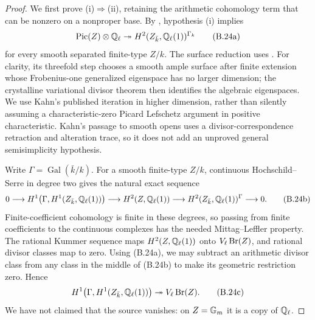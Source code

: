 \begin{proof}
We first prove (i)\(\Rightarrow\)(ii), retaining the arithmetic
cohomology term that can be nonzero on a nonproper base.
By \citet[Theorems~6 and~8, pp.~88--90]{BKahn2023Divisors},
hypothesis (i) implies
\[
 \operatorname{Pic}(Z)\otimes\mathbb Q_\ell
 \twoheadrightarrow H^2(Z_{\bar k},\mathbb Q_\ell(1))^{\Gamma_k}
 \tag{B.24a}
\]
for every smooth separated finite-type \(Z/k\).
The surface reduction uses
\citet[Proposition~4.1, Lemma~4.2 and Theorem~4.3,
author-version pp.~25--27]{BMorrow2019Variational}.
For clarity, its threefold step chooses a smooth ample surface
after finite extension whose Frobenius-one generalized eigenspace
has no larger dimension; the crystalline variational divisor
theorem then identifies the algebraic eigenspaces.  We use Kahn's
published iteration in higher dimension, rather than silently
assuming a characteristic-zero Picard Lefschetz argument in
positive characteristic.  Kahn's passage to smooth opens uses a
divisor-correspondence retraction and alteration trace, so it
does not add an unproved general semisimplicity hypothesis.

Write \(\Gamma=\operatorname{Gal}(\bar k/k)\).
For a smooth finite-type \(Z/k\), continuous Hochschild--Serre
in degree two gives the natural exact sequence
\[
 0\longrightarrow
 H^1\bigl(\Gamma,H^1(Z_{\bar k},\mathbb Q_\ell(1))\bigr)
 \longrightarrow H^2(Z,\mathbb Q_\ell(1))
 \longrightarrow H^2(Z_{\bar k},\mathbb Q_\ell(1))^\Gamma
 \longrightarrow0.
 \tag{B.24b}
\]
Finite-coefficient cohomology is finite in these degrees, so
passing from finite coefficients to the continuous complexes
has the needed Mittag--Leffler property.  The rational Kummer
sequence maps \(H^2(Z,\mathbb Q_\ell(1))\) onto
\(V_\ell\operatorname{Br}(Z)\), and rational divisor classes map to zero.
Using (B.24a), we may subtract an arithmetic divisor class from
any class in the middle of (B.24b) to make its geometric
restriction zero.  Hence
\[
 H^1\bigl(\Gamma,H^1(Z_{\bar k},\mathbb Q_\ell(1))\bigr)
 \twoheadrightarrow V_\ell\operatorname{Br}(Z).
 \tag{B.24c}
\]
We have not claimed that the source vanishes: on \(Z={\mathbb G_m}\)
it is a copy of \(\mathbb Q_\ell\).


\end{proof}
